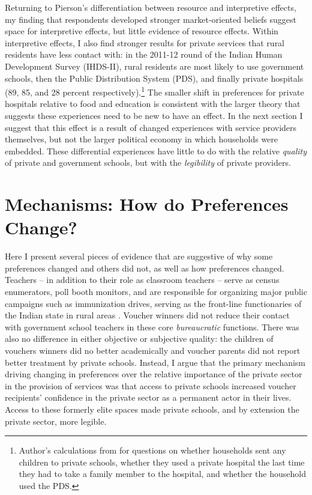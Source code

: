 \documentclass[hidelinks, 12pt, titlepage]{article}
\begin{document}
Returning to Pierson's differentiation between resource and interpretive effects, my finding that respondents developed stronger market-oriented beliefs suggest space for interpretive effects, but little evidence of resource effects. Within interpretive effects, I also find stronger results for private services that rural residents have less contact with: in the 2011-12 round of the Indian Human Development Survey (IHDS-II), rural residents are most likely to use government schools, then the Public Distribution System (PDS), and finally private hospitals (89, 85, and 28 percent respectively).\footnote{Author's calculations from \cite{Desai2018} for questions on whether households sent any children to private schools, whether they used a private hospital the last time they had to take a family member to the hospital, and whether the household used the PDS.}  The smaller shift in preferences for private hospitals relative to food and education is consistent with the larger theory that suggests these experiences need to be new to have an effect.  In the next section I suggest that this effect is a result of changed experiences with service providers themselves, but not the larger political economy in which households were embedded.  These differential experiences have little to do with the relative \emph{quality} of private and government schools, but with the \emph{legibility} of private providers.

\section*{Mechanisms: How do Preferences Change?\label{section:mechanisms}}

	Here I present several pieces of evidence that are suggestive of why some preferences changed and others did not, as well as how preferences changed. Teachers -- in addition to their role as classroom teachers -- serve as census enumerators, poll booth monitors, and are responsible for organizing major public campaigns such as immunization drives, serving as the front-line functionaries of the Indian state in rural areas \citep{Lipsky2010}.  Voucher winners did not reduce their contact with government school teachers in these core \emph{bureaucratic} functions.  There was also no difference in either objective or subjective quality: the children of vouchers winners did no better academically and voucher parents did not report better treatment by private schools.  Instead, I argue that the primary mechanism driving changing in preferences over the relative importance of the private sector in the provision of services was that access to private schools increased voucher recipients' confidence in the private sector as a permanent actor in their lives. Access to these formerly elite spaces made private schools, and by extension the private sector, more legible.
\end{document}
